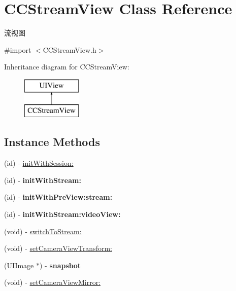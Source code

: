 \hypertarget{interface_c_c_stream_view}{}\section{C\+C\+Stream\+View Class Reference}
\label{interface_c_c_stream_view}


流视图  




{\ttfamily \#import $<$C\+C\+Stream\+View.\+h$>$}

Inheritance diagram for C\+C\+Stream\+View\+:\begin{figure}[H]
\begin{center}
\leavevmode
\includegraphics[height=2.000000cm]{interface_c_c_stream_view}
\end{center}
\end{figure}
\subsection*{Instance Methods}
\begin{DoxyCompactItemize}
\item 
(id) -\/ \hyperlink{interface_c_c_stream_view_a278f8570e685cb68c278ab47c631f9c9}{init\+With\+Session\+:}
\item 
\mbox{\label{interface_c_c_stream_view_a0a8eebb75951ae2ae5ae7ff9ec498b3d}} 
(id) -\/ {\bfseries init\+With\+Stream\+:}
\item 
\mbox{\label{interface_c_c_stream_view_a77d49f2c879cdd8c0db134857df0b03a}} 
(id) -\/ {\bfseries init\+With\+Pre\+View\+:stream\+:}
\item 
\mbox{\label{interface_c_c_stream_view_a64194f8f54e0e1e9d2192fe2f94491bc}} 
(id) -\/ {\bfseries init\+With\+Stream\+:video\+View\+:}
\item 
(void) -\/ \hyperlink{interface_c_c_stream_view_a93cd41f06e817749a0ea635151333688}{switch\+To\+Stream\+:}
\item 
(void) -\/ \hyperlink{interface_c_c_stream_view_a459e2ceb67d1f1c40690d64b6ea609bb}{set\+Camera\+View\+Transform\+:}
\item 
\mbox{\label{interface_c_c_stream_view_a58ecfef01533b88dc54ea3939590a8d2}} 
(U\+I\+Image $\ast$) -\/ {\bfseries snapshot}
\item 
(void) -\/ \hyperlink{interface_c_c_stream_view_acc6bbb88b8529b7e2621ca78bcdee643}{set\+Camera\+View\+Mirror\+:}
\end{DoxyCompactItemize}
